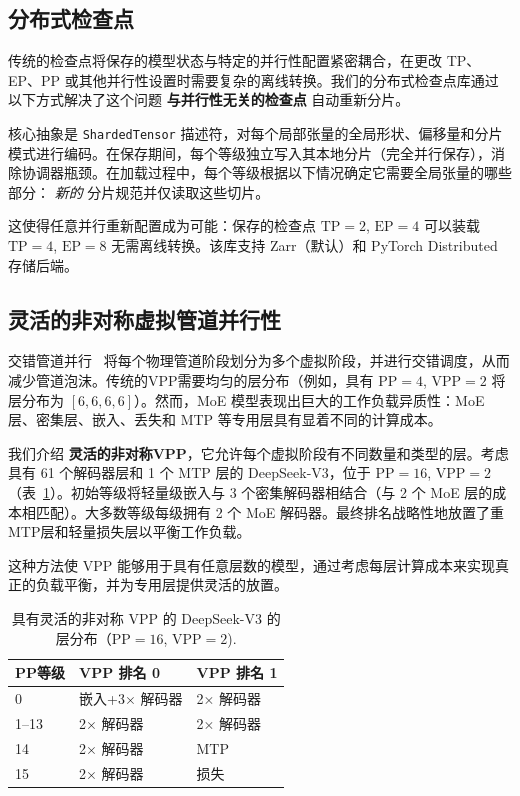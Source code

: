 \subsection{分布式检查点}

传统的检查点将保存的模型状态与特定的并行性配置紧密耦合，在更改 TP、EP、PP 或其他并行性设置时需要复杂的离线转换。我们的分布式检查点库通过以下方式解决了这个问题 \textbf{与并行性无关的检查点} 自动重新分片。

核心抽象是 \texttt{ShardedTensor} 描述符，对每个局部张量的全局形状、偏移量和分片模式进行编码。在保存期间，每个等级独立写入其本地分片（完全并行保存），消除协调器瓶颈。在加载过程中，每个等级根据以下情况确定它需要全局张量的哪些部分： \textit{新的} 分片规范并仅读取这些切片。

这使得任意并行重新配置成为可能：保存的检查点 $\text{TP}=2$, $\text{EP}=4$ 可以装载 $\text{TP}=4$, $\text{EP}=8$ 无需离线转换。该库支持 Zarr（默认）和 PyTorch Distributed~\cite{zhao2023pytorchfsdp} 存储后端。

\subsection{灵活的非对称虚拟管道并行性}\label{sec:flexible-vpp}

交错管道并行~\cite{narayanan2021efficient} 将每个物理管道阶段划分为多个虚拟阶段，并进行交错调度，从而减少管道泡沫。传统的VPP需要均匀的层分布（例如，具有 $\text{PP}=4$, $\text{VPP}=2$ 将层分布为 $[6, 6, 6, 6]$）。然而，MoE 模型表现出巨大的工作负载异质性：MoE 层、密集层、嵌入、丢失和 MTP 等专用层具有显着不同的计算成本。

我们介绍 \textbf{灵活的非对称VPP}，它允许每个虚拟阶段有不同数量和类型的层。考虑具有 61 个解码器层和 1 个 MTP 层的 DeepSeek-V3，位于 $\text{PP}=16$, $\text{VPP}=2$ （表~\ref{tab:flexible-vpp-example}）。初始等级将轻量级嵌入与 3 个密集解码器相结合（与 2 个 MoE 层的成本相匹配）。大多数等级每级拥有 2 个 MoE 解码器。最终排名战略性地放置了重MTP层和轻量损失层以平衡工作负载。

这种方法使 VPP 能够用于具有任意层数的模型，通过考虑每层计算成本来实现真正的负载平衡，并为专用层提供灵活的放置。

\begin{table}[ht]
\centering
\caption{具有灵活的非对称 VPP 的 DeepSeek-V3 的层分布（$\text{PP}=16$, $\text{VPP}=2$).}
\label{tab:flexible-vpp-example}
\begin{tabular}{lll}
\toprule
\textbf{PP等级} & \textbf{VPP 排名 0} & \textbf{VPP 排名 1} \\
\midrule
0       & 嵌入+3$\times$ 解码器 & 2$\times$ 解码器 \\
1--13   & 2$\times$ 解码器             & 2$\times$ 解码器 \\
14      & 2$\times$ 解码器             & MTP \\
15      & 2$\times$ 解码器             & 损失 \\
\bottomrule
\end{tabular}
\end{table}

